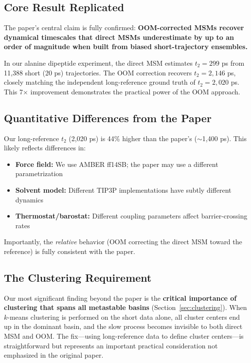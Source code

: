 \documentclass[11pt,a4paper]{article}
\begin{document}
\subsection{Core Result Replicated}

The paper's central claim is fully confirmed: \textbf{OOM-corrected MSMs recover dynamical timescales that direct MSMs underestimate by up to an order of magnitude when built from biased short-trajectory ensembles.}

In our alanine dipeptide experiment, the direct MSM estimates $t_2 = 299$ ps from 11{,}388 short (20 ps) trajectories. The OOM correction recovers $t_2 = 2{,}146$ ps, closely matching the independent long-reference ground truth of $t_2 = 2{,}020$ ps. This 7$\times$ improvement demonstrates the practical power of the OOM approach.

\subsection{Quantitative Differences from the Paper}

Our long-reference $t_2$ (2{,}020 ps) is 44\% higher than the paper's ($\sim$1{,}400 ps). This likely reflects differences in:
\begin{itemize}[nosep]
    \item \textbf{Force field:} We use AMBER ff14SB; the paper may use a different parametrization
    \item \textbf{Solvent model:} Different TIP3P implementations have subtly different dynamics
    \item \textbf{Thermostat/barostat:} Different coupling parameters affect barrier-crossing rates
\end{itemize}

Importantly, the \textit{relative} behavior (OOM correcting the direct MSM toward the reference) is fully consistent with the paper.

\subsection{The Clustering Requirement}

Our most significant finding beyond the paper is the \textbf{critical importance of clustering that spans all metastable basins} (Section~\ref{sec:clustering}). When $k$-means clustering is performed on the short data alone, all cluster centers end up in the dominant basin, and the slow process becomes invisible to both direct MSM and OOM. The fix---using long-reference data to define cluster centers---is straightforward but represents an important practical consideration not emphasized in the original paper.
\end{document}
